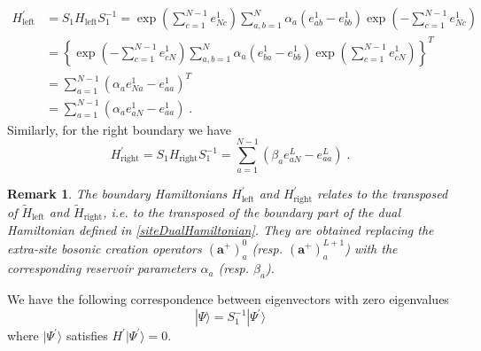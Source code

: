 \documentclass[10pt]{article}
\numberwithin{equation}{section}
\numberwithin{equation}{subsection}
\newtheorem{remark}{Remark}
\newcommand{\dt}{\;.}
\begin{document}
\begin{equation}
	\begin{split}
		H_{\text{left}}^{'}&=S_{1}H_{\text{left}}S_{1}^{-1}=\exp{\left(\sum_{c=1}^{N-1}e_{Nc}^{1}\right)}\sum_{a,b=1}^{N}\alpha_{a}\left(e_{ab}^{1}-e_{bb}^{1}\right)\exp{\left(-\sum_{c=1}^{N-1}e_{Nc}^{1}\right)}
		\\&=
		\left\{\exp{\left(-\sum_{c=1}^{N-1}e_{cN}^{1}\right)}\sum_{a,b=1}^{N}\alpha_{a}\left(e_{ba}^{1}-e_{bb}^{1}\right)\exp{\left(\sum_{c=1}^{N-1}e_{cN}^{1}\right)}\right\}^{T}
		\\&=
		\sum_{a=1}^{N-1}\left(\alpha_{a}e_{Na}^{1}-e_{aa}^{1}\right)^{T}
		\\&=
		\sum_{a=1}^{N-1}\left(\alpha_{a}e_{aN}^{1}-e_{aa}^{1}\right)\dt
	\end{split}
\end{equation}
Similarly, for the right boundary we have 
\begin{equation}
H_{\text{right}}^{'}=S_{1}H_{\text{right}}S_{1}^{-1}=
\sum_{a=1}^{N-1}\left(\beta_{a}e_{aN}^{L}-e_{aa}^{L}\right)\dt
\end{equation}
\begin{remark}
	The boundary Hamiltonians $H_{\text{left}}^{'}$ and $H_{\text{right}}^{'}$ relates to the transposed of  $\widetilde{H}_{\text{left}}$ and $\widetilde{H}_{\text{right}}$, i.e. to the transposed of the boundary part of the dual Hamiltonian  defined in \eqref{siteDualHamiltonian}. They are obtained replacing the  extra-site bosonic creation operators $(\mathbf{a}^{+})_{a}^{0}$  (resp. $(\mathbf{a}^{+})_{a}^{L+1}$) with the corresponding reservoir parameters $\alpha_a$ (resp. $\beta_a$).
\end{remark}
We have the following correspondence between eigenvectors with zero eigenvalues
\begin{equation}\label{S1-Inverse}
	|\Psi\rangle =S_{1}^{-1}|\Psi^{'}\rangle
\end{equation}
where $|\Psi^{'}\rangle$ satisfies $H^{'}|\Psi^{'}\rangle=0$.
\end{document}
